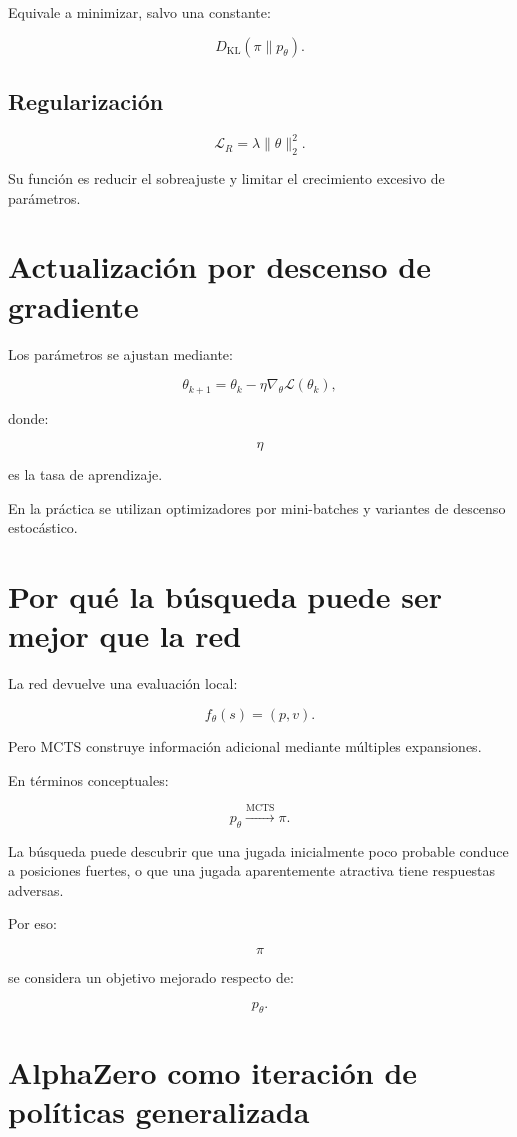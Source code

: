 \documentclass[11pt,a4paper]{article}
\newcommand{\KL}{D_{\mathrm{KL}}}
\begin{document}
Equivale a minimizar, salvo una constante:

\[
\KL(\pi\parallel p_\theta).
\]

\subsection{Regularización}

\[
\mathcal{L}_R
=
\lambda\|\theta\|_2^2.
\]

Su función es reducir el sobreajuste y limitar el crecimiento excesivo de parámetros.

\section{Actualización por descenso de gradiente}

Los parámetros se ajustan mediante:

\[
\theta_{k+1}
=
\theta_k
-
\eta
\nabla_\theta
\mathcal{L}(\theta_k),
\]

donde:

\[
\eta
\]

es la tasa de aprendizaje.

En la práctica se utilizan optimizadores por mini-batches y variantes de descenso estocástico.

\section{Por qué la búsqueda puede ser mejor que la red}

La red devuelve una evaluación local:

\[
f_\theta(s)=(p,v).
\]

Pero MCTS construye información adicional mediante múltiples expansiones.

En términos conceptuales:

\[
p_\theta
\overset{\mathrm{MCTS}}{\longrightarrow}
\pi.
\]

La búsqueda puede descubrir que una jugada inicialmente poco probable conduce a posiciones fuertes, o que una jugada aparentemente atractiva tiene respuestas adversas.

Por eso:

\[
\pi
\]

se considera un objetivo mejorado respecto de:

\[
p_\theta.
\]

\section{AlphaZero como iteración de políticas generalizada}
\end{document}
